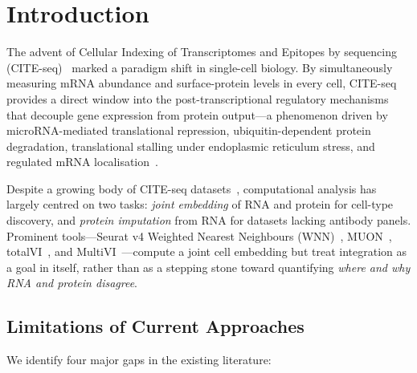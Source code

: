 \documentclass[11pt,a4paper]{article}
\begin{document}
\section{Introduction}\label{sec:intro}

The advent of Cellular Indexing of Transcriptomes and Epitopes by sequencing (CITE-seq)~\citep{stoeckius2017} marked a paradigm shift in single-cell biology.
By simultaneously measuring mRNA abundance and surface-protein levels in every cell, CITE-seq provides a direct window into the post-transcriptional regulatory mechanisms that decouple gene expression from protein output---a phenomenon driven by microRNA-mediated translational repression, ubiquitin-dependent protein degradation, translational stalling under endoplasmic reticulum stress, and regulated mRNA localisation~\citep{vogel2012,liu2016}.

Despite a growing body of CITE-seq datasets~\citep{hao2021,mimitou2021}, computational analysis has largely centred on two tasks: \emph{joint embedding} of RNA and protein for cell-type discovery, and \emph{protein imputation} from RNA for datasets lacking antibody panels.
Prominent tools---Seurat v4 Weighted Nearest Neighbours (WNN)~\citep{hao2021}, MUON~\citep{muon2022}, totalVI~\citep{gayoso2021}, and MultiVI~\citep{ashuach2023}---compute a joint cell embedding but treat integration as a goal in itself, rather than as a stepping stone toward quantifying \emph{where and why RNA and protein disagree}.

\subsection{Limitations of Current Approaches}\label{ssec:limitations}

We identify four major gaps in the existing literature:
\end{document}
